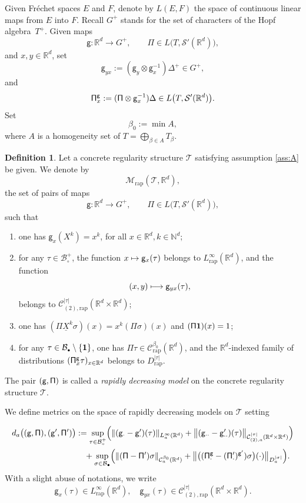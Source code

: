 \documentclass[10pt]{amsart}
\newenvironment{enumeratea}
{\bgroup\def\theenumi{\alph{enumi}}\begin{enumerate}}
{\end{enumerate}\egroup}
\newcommand\mto{\mathchoice{\longmapsto}{\mapsto}{\mapsto}{\mapsto}}
\newcommand{\sbullet}{{\scriptscriptstyle\bullet}}
\theoremstyle{plain}
\theoremstyle{definition}
\newtheorem{defn}[thm]{Definition}
\newcommand{\rap}{\mathrm{rap}}
\newcommand{\sfg}{\mathsf{g}}
\newcommand{\sfPi}{\mathsf{\Pi}}
\newcommand{\scrM}{\mathscr{M}}
\newcommand{\scrT}{\mathscr{T}}
\newcommand{\bbN}{\mathbb{N}}
\newcommand{\bbR}{\mathbb{R}}
\newcommand{\mcB}{\mathcal{B}}
\newcommand{\mcC}{\mathcal{C}}
\newcommand\mcS{\mathcal{S}}
\begin{document}
Given Fréchet spaces $E$ and $F$, denote by $L(E,F)$ the space of continuous linear maps from $E$ into $F$. Recall $G^+$ stands for the set of characters of the Hopf algebra~$T^+$. Given maps
\[
\sfg:\bbR^d\to G^+,\qquad \sfPi\in L\bigl(T,\mcS'(\bbR^d)\bigr),
\]
and $x,y\in\bbR^d$, set
\[
\sfg_{yx} := (\sfg_y\otimes\sfg_x^{-1})\Delta^+\in G^+,
\]
and
\[
{\sf \Pi}^{\sf g}_x:=(\sfPi\otimes\sfg_x^{-1})\Delta\in L\bigl(T,\mcS'(\bbR^d)\bigr).
\]
Set
\[
\beta_0:=\min A,
\]
where $A$ is a homogeneity set of $T=\bigoplus_{\beta\in A}T_\beta$.

\begin{defn} \label{defi:weighted model}
Let a concrete regularity structure $\scrT$ satisfying assumption \eqref{ass:A} be given. We denote by
\[
\scrM_\rap(\scrT,\bbR^d),
\]
the set of pairs of maps
\[
\sfg : \bbR^d\to G^+,\qquad \sfPi\in L\bigl(T,\mcS'(\bbR^d)\bigr),
\]
such that
\begin{enumeratea}
	\item\label{defi:weighted modela} one has $\sfg_x(X^k)=x^k$, for all $x\in\bbR^d, k\in\bbN^d$;

	\item\label{defi:weighted modelb} for any $\tau\in\mcB_\circ^+$, the function $x\mto\sfg_x(\tau)$ belongs to $L_\rap^\infty(\bbR^d)$, and the function
\[
(x,y)\mto\sfg_{yx}(\tau),
\]
belongs to $\mcC_{(2),\rap}^{|\tau|}(\bbR^d\times\bbR^d)$;

	\item\label{defi:weighted modelc} one has $(\sfPi \underline{X}^k\sigma)(x)=x^k(\sfPi\sigma)(x)$ and $(\sfPi{\bf1})(x) = 1$;

	\item\label{defi:weighted modeld} for any $\tau\in\mcB_\sbullet\setminus\{{\bf1}\}$, one has $\sfPi\tau\in \mcC^{\beta_0}_\rap(\bbR^d)$, and the $\bbR^d$-indexed family of distributions $({\sf \Pi}^{\sf g}_x\tau)_{x\in\bbR^d}$ belongs to $D_\rap^{|\tau|}$.
\end{enumeratea}
The pair $\sf (g,\Pi)$ is called a \emph{rapidly decreasing model} on the concrete regularity structure $\scrT$.
\end{defn}

We define metrics on the space of rapidly decreasing models on $\scrT$ setting

\begin{align*}
d_a\bigl(({\sf g},{\sf\Pi}),({\sf g}',{\sf\Pi}')\bigr)
&:= \sup_{\tau\in\mcB_\circ^+}
\Bigl(\|({\sf g}_\cdot-{\sf g}_\cdot')(\tau)\|_{L_a^\infty(\bbR^d)}
+ \big\|({\sf g}_{\cdot\cdot}-{\sf g}_{\cdot\cdot}')(\tau)\big\|_{\mcC^{\vert\tau\vert}_{(2),a}(\bbR^d\times\bbR^d)}\Bigr)\\
&\quad+\sup_{\sigma\in\mcB_\sbullet}
\Bigl(\|({\sf\Pi}-{\sf\Pi}')\sigma\|_{\mcC^{\beta_0}_a(\bbR^d)}
+ \big\|\bigl(({\sf\Pi}_\cdot^{\sf g}-({\sf\Pi}_\cdot')^{{\sf g}'})\sigma\bigr)(\cdot) \big\|_{D^{\vert\sigma\vert}_{a}}\Bigr).
\end{align*}
With a slight abuse of notations, we write
\[
\sfg_x(\tau)\in L_\rap^\infty(\bbR^d),\quad \sfg_{yx}(\tau)\in \mcC_{(2),\rap}^{|\tau|}(\bbR^d\times\bbR^d).
\]
\end{document}
